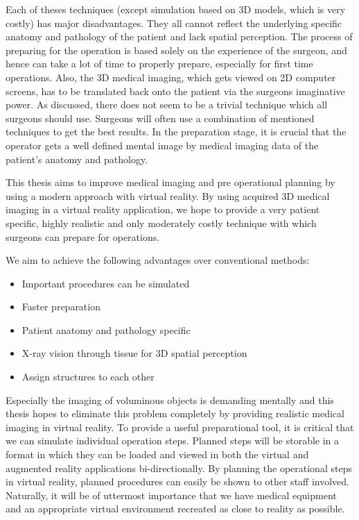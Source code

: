 Each of theses techniques (except simulation based on 3D models, which is very costly) has major disadvantages.
They all cannot reflect the underlying specific anatomy and pathology of the patient and lack spatial perception.
The process of preparing for the operation is based solely on the experience of the surgeon, and hence can take a lot of time to properly prepare, especially for first time operations.
Also, the 3D medical imaging, which gets viewed on 2D computer screens, has to be translated back onto the patient via the surgeons imaginative power. 
As discussed, there does not seem to be a trivial technique which all surgeons should use.
Surgeons will often use a combination of mentioned techniques to get the best results.
In the preparation stage, it is crucial that the operator gets a well defined mental image by medical imaging data of the patient's anatomy and pathology.

This thesis aims to improve medical imaging and pre operational planning by using a modern approach with virtual reality.
By using acquired 3D medical imaging in a virtual reality application, we hope to provide a very patient specific, highly realistic and only moderately costly technique with which surgeons can prepare for operations.

We aim to achieve the following advantages over conventional methods:

\begin{itemize}
    \item Important procedures can be simulated
    \item Faster preparation
    \item Patient anatomy and pathology specific 
    \item X-ray vision through tissue for 3D spatial perception
    \item Assign structures to each other
\end{itemize}

Especially the imaging of voluminous objects is demanding mentally and this thesis hopes to eliminate this problem completely by providing realistic medical imaging in virtual reality.
To provide a useful preparational tool, it is critical that we can simulate individual operation steps.
Planned steps will be storable in a format in which they can be loaded and viewed in both the virtual and augmented reality applications bi-directionally.
By planning the operational steps in virtual reality, planned procedures can easily be shown to other staff involved.
Naturally, it will be of uttermost importance that we have medical equipment and an appropriate virtual environment recreated as close to reality as possible.

